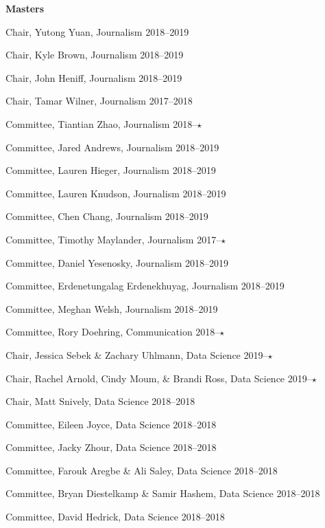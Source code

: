   \textbf{Masters}
    \begin{innerlist}
      \item Chair, Yutong Yuan, Journalism                                      \hfill 2018--2019
      \item Chair, Kyle Brown, Journalism                                       \hfill 2018--2019
      \item Chair, John Heniff, Journalism                                      \hfill 2018--2019
      \item Chair, Tamar Wilner, Journalism                                     \hfill 2017--2018
      \item Committee, Tiantian Zhao, Journalism                                \hfill 2018--$\star$
      \item Committee, Jared Andrews, Journalism                                \hfill 2018--2019
      \item Committee, Lauren Hieger, Journalism                                \hfill 2018--2019
      \item Committee, Lauren Knudson, Journalism                               \hfill 2018--2019
      \item Committee, Chen Chang, Journalism                                   \hfill 2018--2019
      \item Committee, Timothy Maylander, Journalism                            \hfill 2017--$\star$
      \item Committee, Daniel Yesenosky, Journalism                             \hfill 2018--2019
      \item Committee, Erdenetungalag Erdenekhuyag, Journalism                  \hfill 2018--2019
      \item Committee, Meghan Welsh, Journalism                                 \hfill 2018--2019
      \item Committee, Rory Doehring, Communication                             \hfill 2018--$\star$

      \item Chair, Jessica Sebek \& Zachary Uhlmann, Data Science               \hfill 2019--$\star$
      \item Chair, Rachel Arnold, Cindy Moum, \& Brandi Ross, Data Science      \hfill 2019--$\star$
      \item Chair, Matt Snively, Data Science                                   \hfill 2018--2018
      \item Committee, Eileen Joyce, Data Science                               \hfill 2018--2018
      \item Committee, Jacky Zhour, Data Science                                \hfill 2018--2018
      \item Committee, Farouk Aregbe \& Ali Saley, Data Science                 \hfill 2018--2018
      \item Committee, Bryan Diestelkamp \& Samir Hashem, Data Science          \hfill 2018--2018
      \item Committee, David Hedrick, Data Science                              \hfill 2018--2018
    \end{innerlist}\vspace{-.1in}
